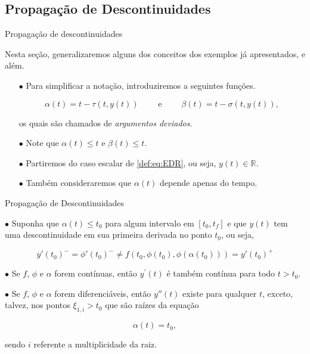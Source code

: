 \documentclass{beamer}
\newcommand{\R}{\mathbb{R}}
\theoremstyle{plain}
\theoremstyle{definition}
\begin{document}
\subsection{Propagação de Descontinuidades}
\begin{frame}{Propagação de descontinuidades}

    Nesta seção, generalizaremos alguns dos conceitos dos exemplos já apresentados, e além.

    \begin{itemize}

        \item[$\bullet$] Para simplificar a notação, introduziremos a seguintes funções.

            \[
                \alpha(t)=t-\tau(t, y(t)) \qquad \text{ e } \qquad \beta(t)=t-\sigma(t, y(t)),
            \]

        \noindent
        os quais são chamados de \textit{argumentos deviados}. 

        \item[$\bullet$] Note que $\alpha(t) \leq t$ e $\beta(t) \leq t$.

        \item[$\bullet$] Partiremos do caso escalar de \eqref{def:eq:EDR}, ou seja, $y(t) \in \R$.

        \item[$\bullet$] Também consideraremos que $\alpha(t)$ depende apenas do tempo.

    \end{itemize}
         

\end{frame}



\begin{frame}{Propagação de Descontinuidades}
    


    $\bullet$ Suponha que $\alpha(t) \leq t_0$ para algum intervalo em $[t_0, t_f]$ e que $y(t)$ tem uma descontinuidade em sua primeira derivada no ponto $t_0$, ou seja, 

    \[
        y'(t_0)^- = \phi'(t_0)^- \neq f(t_0, \phi(t_0), \phi(\alpha(t_0))) = y'(t_0)^+
    \]

    $\bullet$ Se \(f\), \(\phi\) e \(\alpha\) forem contínuas, então  \(y^{\prime}(t)\) é também contínua para todo \(t>t_{0}\). 
    
    $\bullet$ Se \(f\), \(\phi\) e \(\alpha\) forem diferenciáveis, então \(y''(t)\) existe para qualquer \(t\), exceto, talvez, nos pontos \(\xi_{1, i} >t_{0}\) que são raízes da equação


    \[
        \alpha(t)=t_{0},
    \]

    sendo $i$ referente a multiplicidade da raiz.

\end{frame}
\end{document}
